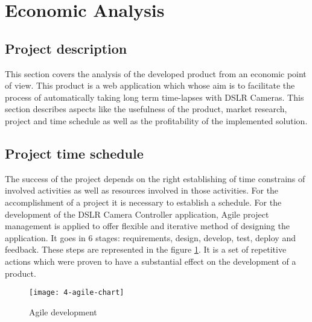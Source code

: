 \section{Economic Analysis}\label{sec:economy}

\subsection{Project description}
This section covers the analysis of the developed product from an economic point of view. This product is a web application which whose aim is to facilitate the process of automatically taking long term time-lapses with DSLR Cameras. This section describes aspects like the usefulness of the product, market research, project and time schedule as well as the profitability of the implemented solution.

\subsection{Project time schedule}
The success of the project depends on the right establishing of time constrains of involved activities
as well as resources involved in those activities. For the accomplishment of a project it is necessary to establish a schedule. For the development of the DSLR Camera Controller application, Agile project management is applied to offer flexible and iterative method of designing the application. It goes in 6 stages: requirements, design, develop, test, deploy and feedback. These steps are represented in the figure \mbox{\ref{agile}}. It is a set of repetitive actions which were proven to have a substantial effect on the development of a product.

\begin{figure}[!ht]
\centering
\texttt{[image: 4-agile-chart]}
\caption{Agile development}\label{agile}
\end{figure}

% 

